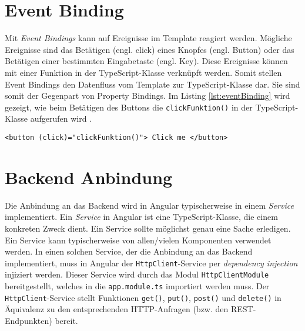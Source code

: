 \section{Event Binding}\label{subsec:eventBinding}

Mit \textit{Event Bindings} kann auf Ereignisse im Template reagiert werden. Mögliche Ereignisse sind das Betätigen (engl. click) eines Knopfes (engl. Button) oder das Betätigen einer bestimmten Eingabetaste (engl. Key). 
Diese Ereignisse können mit einer Funktion in der TypeScript-Klasse verknüpft werden. Somit stellen Event Bindings den Datenfluss vom Template zur TypeScript-Klasse dar. Sie sind somit der Gegenpart von Property Bindings. 
Im Listing \ref{lst:eventBinding} wird gezeigt, wie beim Betätigen des Buttons die \texttt{clickFunktion()} in der TypeScript-Klasse aufgerufen wird \cite{Book2020}\cite{eventBinding2021}.

\begin{lstlisting}[caption=Event Binding, label=lst:eventBinding]
    <button (click)="clickFunktion()"> Click me </button>
\end{lstlisting}

\section{Backend Anbindung}

Die Anbindung an das Backend wird in Angular typischerweise in einem \textit{Service} implementiert. Ein \textit{Service} in Angular ist eine TypeScript-Klasse, die einem konkreten Zweck dient. Ein Service sollte möglichst genau eine Sache erledigen. Ein Service kann typischerweise von allen/vielen Komponenten verwendet werden. In einen solchen Service, der die Anbindung an das Backend implementiert, muss in Angular der \texttt{HttpClient}-Service per \textit{dependency injection} injiziert werden. Dieser Service wird durch das Modul \texttt{HttpClientModule} bereitgestellt, welches in die \texttt{app.module.ts} importiert werden muss. Der \texttt{HttpClient}-Service stellt Funktionen \texttt{get()}, \texttt{put()}, \texttt{post()} und \texttt{delete()} in Äquivalenz zu den entsprechenden HTTP-Anfragen (bzw. den REST-Endpunkten) bereit.